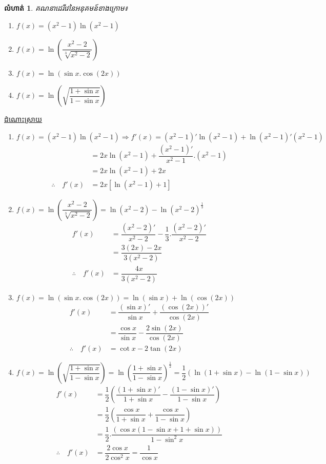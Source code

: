 \documentclass[12pt,fleqn]{book} %
\newtheorem{exercise}{\kml លំហាត់}
\newcommand{\answer}{\begin{center}
\kml \color{blue} \underline{ដំណោះស្រាយ}
\end{center}}
\begin{document}
\begin{exercise}
គណនាដេរីវេនៃអនុគមន៍ខាងក្រោម៖
\begin{multicols}{2}
\begin{enumerate}
\item $f(x)=(x^2-1)\ln (x^2-1)$
\item $f(x)=\ln \left( \dfrac{x^2-2}{\sqrt[3]{x^2-2}} \right)$
\item $f(x)=\ln (\sin x.\cos(2x))$
\item $f(x)=\ln \left(\sqrt{\dfrac{1+\sin x}{1-\sin x}} \right)$
\end{enumerate}
\end{multicols}
\end{exercise}
\answer 
\begin{enumerate}
\item $f(x)=(x^2-1)\ln (x^2-1)\Longrightarrow f'(x)=(x^2-1)'\ln (x^2-1)+\ln (x^2-1)' (x^2-1)$
\begin{align*}
&=2x\ln (x^2-1)+\dfrac{(x^2-1)'}{x^2-1}.(x^2-1)\\
&=2x\ln (x^2-1)+2x\\
\therefore \quad f'(x)&=2x[ \ln (x^2-1)+1]
\end{align*}
\item $f(x)=\ln \left( \dfrac{x^2-2}{\sqrt[3]{x^2-2}} \right)=\ln (x^2-2)-\ln (x^2-2)^{\frac{1}{3}}$
\begin{align*}
f'(x)&=\dfrac{(x^2-2)'}{x^2-2}-\dfrac{1}{3}.\dfrac{(x^2-2)'}{x^2-2}\\
&=\dfrac{3(2x)-2x}{3(x^2-2)}\\
\therefore \quad f'(x)&=\dfrac{4x}{3(x^2-2)}
\end{align*}
\item $f(x)=\ln (\sin x.\cos(2x))=\ln (\sin x)+\ln (\cos (2x))$
\begin{align*}
f'(x)&=\dfrac{(\sin x)'}{\sin x}+\dfrac{(\cos (2x))'}{\cos (2x)}\\
&=\dfrac{\cos x}{\sin x}-\dfrac{2\sin (2x)}{\cos (2x)}\\
\therefore \quad f'(x)&= \cot x -2\tan (2x)
\end{align*}
\item $f(x)=\ln \left(\sqrt{\dfrac{1+\sin x}{1-\sin x}} \right)=\ln \left( \dfrac{1+\sin x}{1-\sin x} \right)^{\frac{1}{2}}=\dfrac{1}{2}\left(\ln (1+\sin x)-\ln (1-\sin x)\right)$
\begin{align*}
f'(x)&=\dfrac{1}{2}\left(\dfrac{(1+\sin x)'}{1+\sin x}-\dfrac{(1-\sin x)'}{1-\sin x} \right)\\
&=\dfrac{1}{2}\left(\dfrac{\cos x}{1+\sin x}+\dfrac{\cos x}{1-\sin x} \right)\\
&=\dfrac{1}{2}.\dfrac{\left(\cos x(1-\sin x +1+\sin x) \right)}{1-\sin^2 x}\\
\therefore \quad f'(x)&=\dfrac{2\cos x}{2\cos^2 x}=\dfrac{1}{\cos x}
\end{align*}
\end{enumerate}
\end{document}

